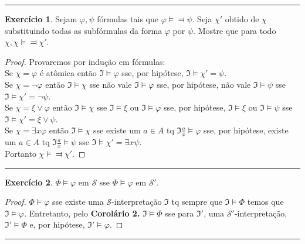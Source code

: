 \documentclass[11pt]{article}
\theoremstyle{definition}
\newtheorem{exer}{Exercício}
\newcommand{\mc}[1]{\mathcal{#1}}
\newcommand{\mf}[1]{\mathfrak{#1}}
\begin{document}
\hrule

\begin{exer}
Sejam $\varphi,\psi$ fórmulas tais que $\varphi\vDash\Dashv\psi$. Seja $\chi'$ obtido de $\chi$ substituindo todas as subfórmulas da forma $\varphi$ por $\psi$. Mostre que para todo $\chi,\chi\vDash\Dashv\chi'$.

\begin{proof}
Provaremos por indução em fórmulas:\\
Se $\chi=\varphi$ é atômica então $\mf{I}\vDash\varphi$ sse, por hipótese, $\mf{I}\vDash\chi'=\psi$.\\
Se $\chi=\neg\varphi$ então $\mf{I}\vDash\chi$ sse não vale $\mf{I}\vDash\varphi$ sse, por hipótese, não vale $\mf{I}\vDash\psi$ sse $\mf{I}\vDash\chi'=\neg\psi$.\\
Se $\chi=\xi\vee\varphi$ então $\mf{I}\vDash\chi$ sse $\mf{I}\vDash\xi$ ou $\mf{I}\vDash\varphi$ sse, por hipótese, $\mf{I}\vDash\xi$ ou $\mf{I}\vDash\psi$ sse $\mf{I}\vDash\chi'=\xi\vee\psi$.\\
Se $\chi=\exists x\varphi$ então $\mf{I}\vDash\chi$ sse existe um $a\in A$ tq $\mf{I}\frac{a}{x}\vDash\varphi$ sse, por hipótese, existe um $a\in A$ tq $\mf{I}\frac{a}{x}\vDash\psi$ sse $\mf{I}\vDash\chi'=\exists x\psi$.\\
Portanto $\chi\vDash\Dashv\chi'$.
\end{proof}
\end{exer}

\hrule

\begin{exer}
$\Phi\vDash\varphi$ em $\mc{S}$ sse $\Phi\vDash\varphi$ em $\mc{S}'$.

\begin{proof}
$\Phi\vDash\varphi$ sse existe uma $\mc{S}$-interpretação $\mf{I}$ tq sempre que $\mf{I}\vDash\Phi$ temos que $\mf{I}\vDash\varphi$. Entretanto, pelo \textbf{Corolário 2.} $\mf{I}\vDash\Phi$ sse para $\mf{I}'$, uma $\mc{S}'$-interpretação, $\mf{I}'\vDash\Phi$ e, por hipótese, $\mf{I}'\vDash\varphi$.
\end{proof}
\end{exer}

\hrule
\end{document}
